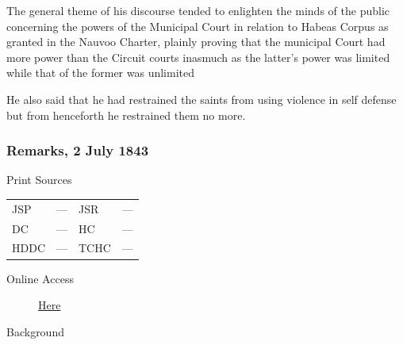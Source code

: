 					The general theme of his discourse tended to enlighten the minds of the public concerning the powers of the Municipal Court in relation to Habeas Corpus as granted in the Nauvoo Charter, plainly proving that the municipal Court had more power than the Circuit courts inasmuch as the latter's power was limited while that of the former was unlimited
					
					He also said that he had restrained the saints from using violence in self defense but from henceforth he restrained them no more.
					
		\subsubsection{Remarks, 2 July 1843}
			\label{EMS-1843-JS-2-JUL-1843}
			
			\begin{description}
				\item[Print Sources]
			\end{description}

				\begin{tabular}{p{0.5in}p{1in}p{0.5in}p{1in}}
				JSP	 	& ---		& JSR 		& --- \\
				DC	 	& ---		& HC 		& --- \\
				HDDC 	& ---		& TCHC 		& --- \\
				\end{tabular}
			
			\begin{description}
				\item[Online Access] \href{https://www.josephsmithpapers.org/paper-summary/remarks-2-july-1843/1}{Here}
			\end{description}
			
			\begin{description}
				\item[Background]
			\end{description}
			
			
